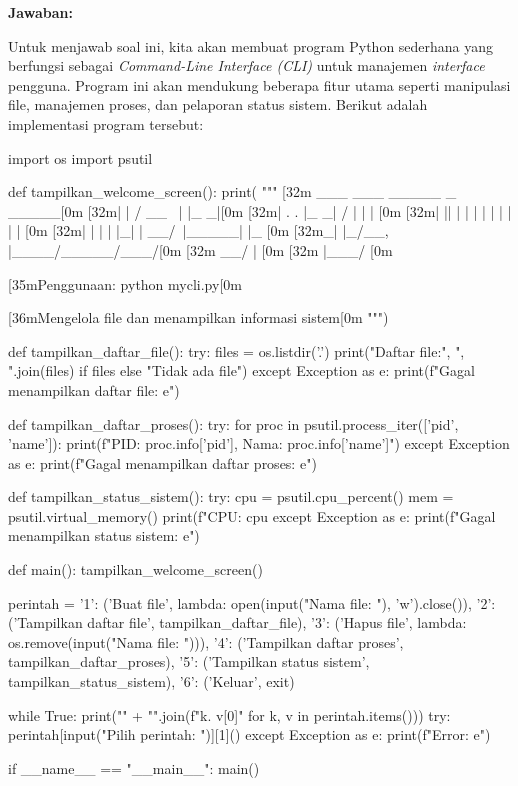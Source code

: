 \documentclass[12pt]{article}
\begin{document}
\textbf{Jawaban:}
\par Untuk menjawab soal ini, kita akan membuat program Python sederhana yang berfungsi sebagai \textit{Command-Line Interface (CLI)} untuk manajemen \textit{interface} pengguna. Program ini akan mendukung beberapa fitur utama seperti manipulasi file, manajemen proses, dan pelaporan status sistem. Berikut adalah implementasi program tersebut:
\begin{python}
    import os
    import psutil
    
    def tampilkan_welcome_screen():
        print(
            """
        [32m ___  ___      _____ _     _____[0m
        [32m|  \/  |     /  __ \ |   |_   _|[0m
        [32m| .  . |_   _| /  \/ |     | |  [0m
        [32m| |\/| | | | | |   | |     | |  [0m
        [32m| |  | | |_| | \__/\ |_____| |_ [0m
        [32m\_|  |_/\__, |\____/\_____/\___/[0m
        [32m         __/ |                  [0m
        [32m        |___/                   [0m
    
        [35mPenggunaan: python mycli.py[0m
    
        [36mMengelola file dan menampilkan informasi sistem[0m
        """)
    
    def tampilkan_daftar_file():
        try:
            files = os.listdir('.')
            print("Daftar file:", ", ".join(files) if files else "Tidak ada file")
        except Exception as e:
            print(f"Gagal menampilkan daftar file: {e}")
    
    def tampilkan_daftar_proses():
        try:
            for proc in psutil.process_iter(['pid', 'name']):
                print(f"PID: {proc.info['pid']}, Nama: {proc.info['name']}")
        except Exception as e:
            print(f"Gagal menampilkan daftar proses: {e}")
    
    def tampilkan_status_sistem():
        try:
            cpu = psutil.cpu_percent()
            mem = psutil.virtual_memory()
            print(f"CPU: {cpu}%
        except Exception as e:
            print(f"Gagal menampilkan status sistem: {e}")
    
    def main():
        tampilkan_welcome_screen()
        
        perintah = {
            '1': ('Buat file', 
                    lambda: open(input("Nama file: "), 'w').close()),
            '2': ('Tampilkan daftar file', 
                    tampilkan_daftar_file),
            '3': ('Hapus file', 
                    lambda: os.remove(input("Nama file: "))),
            '4': ('Tampilkan daftar proses', 
                    tampilkan_daftar_proses),
            '5': ('Tampilkan status sistem', 
                    tampilkan_status_sistem),
            '6': ('Keluar', 
                    exit)
        }
        
        while True:
            print("\n" + "\n".join(f"{k}. {v[0]}" for k, v in perintah.items()))
            try:
                perintah[input("Pilih perintah: ")][1]()
            except Exception as e:
                print(f"Error: {e}")
    
    if __name__ == "__main__":
        main()
\end{python}
\end{document}
